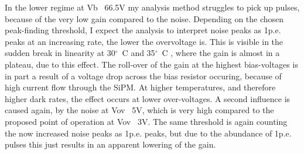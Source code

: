 \documentclass[12pt,article,type=msc,colorback,accentcolor=tud9c]{tudthesis}
\begin{document}

In the lower regime at Vb ~66.5V my analysis method struggles to pick up pulses, because of the very low gain compared to the noise. Depending on the chosen peak-finding threshold, I expect the analysis to interpret noise peaks as 1p.e. peaks at an increasing rate, the lower the overvoltage is. This is visible in the sudden break in linearity at 30$^{\circ}$~C and 35$^{\circ}$~C , where the gain is almost in a plateau, due to this effect. The roll-over of the gain at the highest bias-voltages is in part a result of a voltage drop across the bias resistor occuring, because of high current flow through the SiPM. At higher temperatures, and therefore higher dark rates, the effect occurs at lower over-voltages. A second influence is caused again, by the noise at Vov ~5V, which is very high compared to the proposed point of operation at Vov ~3V. The same threshold is again counting the now increased noise peaks as 1p.e. peaks, but due to the abundance of 1p.e. pulses this just results in an apparent lowering of the gain.
\begin{figure}[h]
\begin{centering}
\caption{}
\label{fig:}
\end{centering}
\end{figure}



\end{document}
